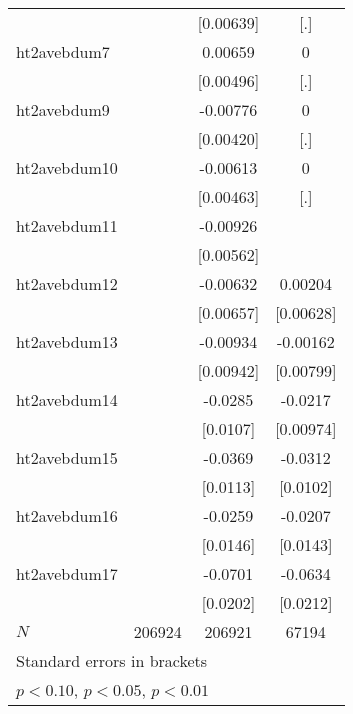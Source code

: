 {\begin{tabular}{l*{3}{c}}
            &                     &   [0.00639]         &         [.]         \\
[1em]
ht2avebdum7 &                     &     0.00659         &           0         \\
            &                     &   [0.00496]         &         [.]         \\
[1em]
ht2avebdum9 &                     &    -0.00776\sym{*}  &           0         \\
            &                     &   [0.00420]         &         [.]         \\
[1em]
ht2avebdum10&                     &    -0.00613         &           0         \\
            &                     &   [0.00463]         &         [.]         \\
[1em]
ht2avebdum11&                     &    -0.00926         &                     \\
            &                     &   [0.00562]         &                     \\
[1em]
ht2avebdum12&                     &    -0.00632         &     0.00204         \\
            &                     &   [0.00657]         &   [0.00628]         \\
[1em]
ht2avebdum13&                     &    -0.00934         &    -0.00162         \\
            &                     &   [0.00942]         &   [0.00799]         \\
[1em]
ht2avebdum14&                     &     -0.0285\sym{***}&     -0.0217\sym{**} \\
            &                     &    [0.0107]         &   [0.00974]         \\
[1em]
ht2avebdum15&                     &     -0.0369\sym{***}&     -0.0312\sym{***}\\
            &                     &    [0.0113]         &    [0.0102]         \\
[1em]
ht2avebdum16&                     &     -0.0259\sym{*}  &     -0.0207         \\
            &                     &    [0.0146]         &    [0.0143]         \\
[1em]
ht2avebdum17&                     &     -0.0701\sym{***}&     -0.0634\sym{***}\\
            &                     &    [0.0202]         &    [0.0212]         \\
\hline
\(N\)       &      206924         &      206921         &       67194         \\
\hline\hline
\multicolumn{4}{l}{\footnotesize Standard errors in brackets}\\
\multicolumn{4}{l}{\footnotesize \sym{*} \(p<0.10\), \sym{**} \(p<0.05\), \sym{***} \(p<0.01\)}\\
\end{tabular}
}
